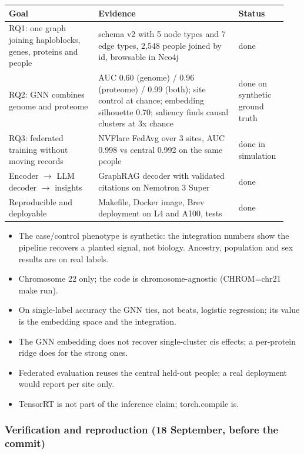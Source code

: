 \documentclass[11pt,a4paper]{article}
\begin{document}
\begin{longtable}{p{0.301\linewidth}p{0.470\linewidth}p{0.169\linewidth}}
\toprule
\textbf{Goal} & \textbf{Evidence} & \textbf{Status} \\
\midrule
\endhead
RQ1: one graph joining haploblocks, genes, proteins and people & schema v2 with 5 node types and 7 edge types, 2,548 people joined by id, browsable in Neo4j & done \\
RQ2: GNN combines genome and proteome & AUC 0.60 (genome) / 0.96 (proteome) / 0.99 (both); site control at chance; embedding silhouette 0.70; saliency finds causal clusters at 3x chance & done on synthetic ground truth \\
RQ3: federated training without moving records & NVFlare FedAvg over 3 sites, AUC 0.998 vs central 0.992 on the same people & done in simulation \\
Encoder $\rightarrow$ LLM decoder $\rightarrow$ insights & GraphRAG decoder with validated citations on Nemotron 3 Super & done \\
Reproducible and deployable & Makefile, Docker image, Brev deployment on L4 and A100, tests & done \\
\bottomrule
\end{longtable}

\begin{itemize}[leftmargin=1.4em]
  \item The case/control phenotype is synthetic: the integration numbers show the pipeline recovers a planted signal, not biology. Ancestry, population and sex results are on real labels.
  \item Chromosome 22 only; the code is chromosome-agnostic (CHROM=chr21 make run).
  \item On single-label accuracy the GNN ties, not beats, logistic regression; its value is the embedding space and the integration.
  \item The GNN embedding does not recover single-cluster cis effects; a per-protein ridge does for the strong ones.
  \item Federated evaluation reuses the central held-out people; a real deployment would report per site only.
  \item TensorRT is not part of the inference claim; torch.compile is.
\end{itemize}

\subsubsection{Verification and reproduction (18 September, before the commit)}
\end{document}
